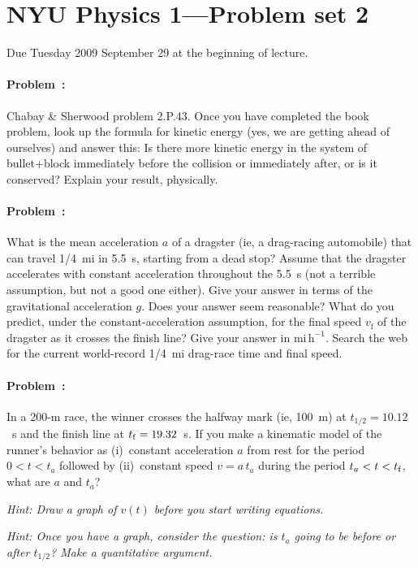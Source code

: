 \documentclass[12pt]{article}
\begin{document}
\thispagestyle{empty}

\section*{NYU Physics 1---Problem set 2}

Due Tuesday 2009 September 29 at the beginning of lecture.

\paragraph{Problem~\theproblem:}%
Chabay \& Sherwood problem 2.P.43.  Once you have completed the book
problem, look up the formula for kinetic energy (yes, we are getting
ahead of ourselves) and answer this: Is there more kinetic energy in
the system of bullet+block immediately before the collision or
immediately after, or is it conserved?  Explain your result,
physically.

\paragraph{Problem~\theproblem:}%
What is the mean acceleration $a$ of a dragster (ie, a drag-racing
automobile) that can travel 1/4~mi in 5.5~s, starting from a dead
stop?  Assume that the dragster accelerates with constant acceleration
throughout the 5.5~s (not a terrible assumption, but not a good one
either).  Give your answer in terms of the gravitational acceleration
$g$.  Does your answer seem reasonable?  What do you predict, under
the constant-acceleration assumption, for the final speed
$v_\mathrm{f}$ of the dragster as it crosses the finish line?  Give
your answer in $\mathrm{mi\,h^{-1}}$.  Search the web for the current
world-record 1/4~mi drag-race time and final speed.

\paragraph{Problem~\theproblem:}%
In a 200-m race, the winner crosses the halfway mark (ie, 100~m) at
$t_{1/2}=10.12$~s and the finish line at $t_{\rm f}=19.32$~s.  If you
make a kinematic model of the runner's behavior as (i)~constant
acceleration $a$ from rest for the period $0<t<t_a$ followed by
(ii)~constant speed $v=a\,t_a$ during the period $t_a<t<t_{\rm f}$,
what are $a$ and $t_a$?

\emph{Hint: Draw a graph of $v(t)$ before you start writing equations.}

\emph{Hint: Once you have a graph, consider the question: is $t_a$
going to be before or after $t_{1/2}$?  Make a quantitative argument.}
\end{document}
